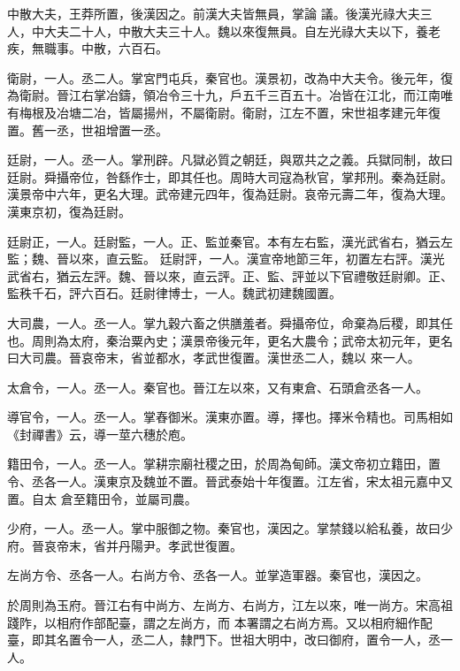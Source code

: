 \begin{pinyinscope}
 中散大夫，王莽所置，後漢因之。前漢大夫皆無員，掌論
 議。後漢光祿大夫三人，中大夫二十人，中散大夫三十人。魏以來復無員。自左光祿大夫以下，養老疾，無職事。中散，六百石。



 衛尉，一人。丞二人。掌宮門屯兵，秦官也。漢景初，改為中大夫令。後元年，復為衛尉。晉江右掌冶鑄，領冶令三十九，戶五千三百五十。冶皆在江北，而江南唯有梅根及冶塘二冶，皆屬揚州，不屬衛尉。衛尉，江左不置，宋世祖孝建元年復置。舊一丞，世祖增置一丞。



 廷尉，一人。丞一人。掌刑辟。凡獄必質之朝廷，與眾共之之義。兵獄同制，故曰廷尉。舜攝帝位，咎繇作士，即其任也。周時大司寇為秋官，掌邦刑。秦為廷尉。漢景帝中六年，更名大理。武帝建元四年，復為廷尉。哀帝元壽二年，復為大理。漢東京初，復為廷尉。



 廷尉正，一人。廷尉監，一人。正、監並秦官。本有左右監，漢光武省右，猶云左監；魏、晉以來，直云監。
 廷尉評，一人。漢宣帝地節三年，初置左右評。漢光武省右，猶云左評。魏、晉以來，直云評。正、監、評並以下官禮敬廷尉卿。正、監秩千石，評六百石。廷尉律博士，一人。魏武初建魏國置。



 大司農，一人。丞一人。掌九穀六畜之供膳羞者。舜攝帝位，命棄為后稷，即其任也。周則為太府，秦治粟內史；漢景帝後元年，更名大農令；武帝太初元年，更名曰大司農。晉哀帝末，省並都水，孝武世復置。漢世丞二人，魏以
 來一人。



 太倉令，一人。丞一人。秦官也。晉江左以來，又有東倉、石頭倉丞各一人。



 導官令，一人。丞一人。掌舂御米。漢東亦置。導，擇也。擇米令精也。司馬相如《封禪書》云，導一莖六穗於庖。



 籍田令，一人。丞一人。掌耕宗廟社稷之田，於周為甸師。漢文帝初立籍田，置令、丞各一人。漢東京及魏並不置。晉武泰始十年復置。江左省，宋太祖元嘉中又置。自太
 倉至籍田令，並屬司農。



 少府，一人。丞一人。掌中服御之物。秦官也，漢因之。掌禁錢以給私養，故曰少府。晉哀帝末，省并丹陽尹。孝武世復置。



 左尚方令、丞各一人。右尚方令、丞各一人。並掌造軍器。秦官也，漢因之。



 於周則為玉府。晉江右有中尚方、左尚方、右尚方，江左以來，唯一尚方。宋高祖踐阼，以相府作部配臺，謂之左尚方，而
 本署謂之右尚方焉。又以相府細作配臺，即其名置令一人，丞二人，隸門下。世祖大明中，改曰御府，置令一人，丞一人。




\end{pinyinscope}
